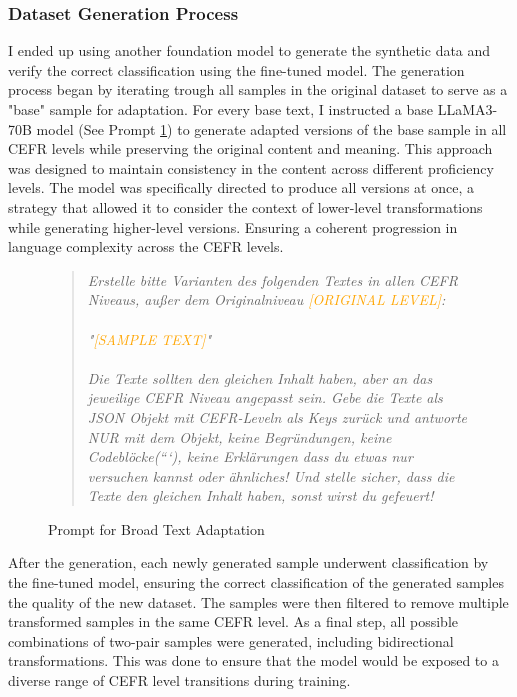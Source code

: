 \subsubsection*{Dataset Generation Process}
\label{sss:dataset_generation_process}
I ended up using another foundation model to generate the synthetic data and verify the correct classification using the fine-tuned model.
The generation process began by iterating trough all samples in the original dataset to serve as a "base" sample for adaptation. For every base text, I instructed a base LLaMA3-70B model (See Prompt \ref{qu:adaptation_prompt}) to generate adapted versions of the base sample in all CEFR levels while preserving the original content and meaning. This approach was designed to maintain consistency in the content across different proficiency levels. The model was specifically directed to produce all versions at once, a strategy that allowed it to consider the context of lower-level transformations while generating higher-level versions. Ensuring a coherent progression in language complexity across the CEFR levels.

\captionsetup{labelformat=prompt}
\begin{figure}[h]
    \begin{quotation}
        \textit{
            Erstelle bitte Varianten des folgenden Textes in allen CEFR Niveaus, außer dem Originalniveau \textcolor{orange}{[ORIGINAL LEVEL]}: \\ \\
            "\textcolor{orange}{[SAMPLE TEXT]}" \\ \\
            Die Texte sollten den gleichen Inhalt haben, aber an das jeweilige CEFR Niveau angepasst sein. Gebe die Texte als JSON Objekt mit CEFR-Leveln als Keys zurück und antworte NUR mit dem Objekt, keine Begründungen, keine Codeblöcke(```), keine Erklärungen dass du etwas nur versuchen kannst oder ähnliches! Und stelle sicher, dass die Texte den gleichen Inhalt haben, sonst wirst du gefeuert!
        }
    \end{quotation}
    \caption{Prompt for Broad Text Adaptation}
    \label{qu:adaptation_prompt}
\end{figure}
\captionsetup{labelformat=default}

After the generation, each newly generated sample underwent classification by the fine-tuned model, ensuring the correct classification of the generated samples the quality of the new dataset. The samples were then filtered to remove multiple transformed samples in the same CEFR level. As a final step, all possible combinations of two-pair samples were generated, including bidirectional transformations. This was done to ensure that the model would be exposed to a diverse range of CEFR level transitions during training.

